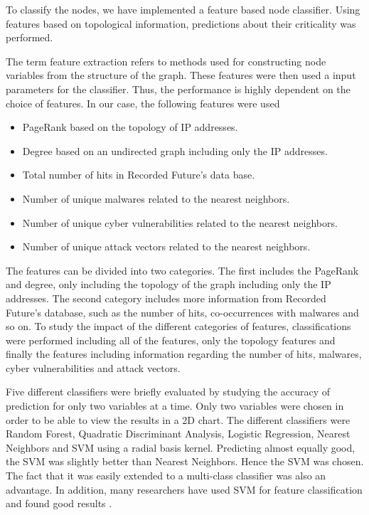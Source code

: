 To classify the nodes, we have implemented a feature based node classifier. Using features based on topological information, predictions about their criticality was performed.

The term feature extraction refers to methods used for constructing node variables from the structure of the graph. These features were then used a input parameters for the classifier. Thus, the performance is highly dependent on the choice of features. In our case, the following features were used
\begin{itemize}
    \item PageRank based on the topology of IP addresses.
    \item Degree based on an undirected graph including only the IP addresses.
    \item Total number of hits in Recorded Future's data base.
    \item Number of unique malwares related to the nearest neighbors.
    \item Number of unique cyber vulnerabilities related to the nearest neighbors.
    \item Number of unique attack vectors related to the nearest neighbors.
\end{itemize}

The features can be divided into two categories. The first includes the PageRank and degree, only including the topology of the graph including only the IP addresses. The second category includes more information from Recorded Future's database, such as the number of hits, co-occurrences with malwares and so on. To study the impact of the different categories of features, classifications were performed including all of the features, only the topology features and finally the features including information regarding the number of hits, malwares, cyber vulnerabilities and attack vectors.

Five different classifiers were briefly evaluated by studying the accuracy of prediction for only two variables at a time. Only two variables were chosen in order to be able to view the results in a 2D chart. The different classifiers were Random Forest, Quadratic Discriminant Analysis, Logistic Regression, Nearest Neighbors and SVM using a radial basis kernel. Predicting almost equally good, the SVM was slightly better than Nearest Neighbors. Hence the SVM was chosen. The fact that it was easily extended to a multi-class classifier was also an advantage. In addition, many researchers have used SVM for feature classification and found good results \citep{campbell2011}.

